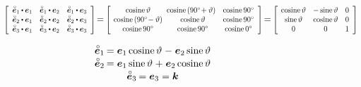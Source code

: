 \begin{figure}[!htbp]
\begin{center}
\begin{tikzpicture}[scale=4, tdplot_main_coords]
\end{tikzpicture}
\end{center}

\vspace{-1em}\[
\scalebox{0.8}[0.85]{$\left[ \begin{array}{ccc}
\mathcircabove{\bm{e}}_1 \dotp \bm{e}_1 & \mathcircabove{\bm{e}}_1 \dotp \bm{e}_2 & \mathcircabove{\bm{e}}_1 \dotp \bm{e}_3 \\
\mathcircabove{\bm{e}}_2 \dotp \bm{e}_1 & \mathcircabove{\bm{e}}_2 \dotp \bm{e}_2 & \mathcircabove{\bm{e}}_2 \dotp \bm{e}_3 \\
\mathcircabove{\bm{e}}_3 \dotp \bm{e}_1 & \mathcircabove{\bm{e}}_3 \dotp \bm{e}_2 & \mathcircabove{\bm{e}}_3 \dotp \bm{e}_3
\end{array} \right]$} \hspace{-0.32ex} = \hspace{-0.2ex}
%
\scalebox{0.8}[0.85]{$\left[ \hspace{-0.2ex} \begin{array}{ccc}
\cosine \vartheta & \hspace{-1ex} \cosine \left( 90\degree \!+ \vartheta \right) & \cosine 90\degree \\
\cosine \left( 90\degree \!- \vartheta \right) & \cosine \vartheta & \cosine 90\degree \\
\cosine 90\degree & \cosine 90\degree & \cosine 0\degree
\end{array} \right]$} \hspace{-0.32ex} = \hspace{-0.2ex}
%
\scalebox{0.8}[0.85]{$\left[ \hspace{-0.1ex} \begin{array}{ccc}
\cosine \vartheta & - \sine \vartheta & 0 \\
\sine \vartheta & \cosine \vartheta & 0 \\
0 & 0 & 1
\end{array} \right]$}
\]

\vspace{-0.8em}
\[\begin{array}{c}
\mathcircabove{\bm{e}}_1 \hspace{-0.16ex} = \bm{e}_1 \cosine \vartheta \hspace{.1ex} - \hspace{.1ex} \bm{e}_2 \sine \vartheta \\[0.1em]
\mathcircabove{\bm{e}}_2 \hspace{-0.16ex} = \bm{e}_1 \sine \vartheta \hspace{.1ex} + \hspace{.1ex} \bm{e}_2 \cosine \vartheta \\[0.1em]
\mathcircabove{\bm{e}}_3 \hspace{-0.16ex} = \bm{e}_3 = \bm{k}
\end{array}\]


\end{figure}

